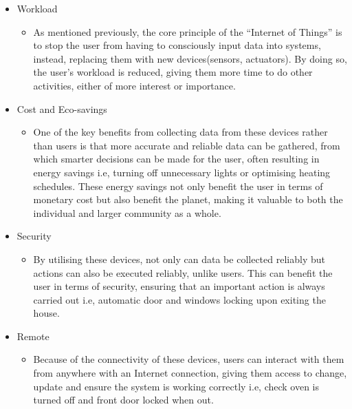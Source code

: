 \begin{itemize}
	\item Workload 
	\begin{itemize}
		\item As mentioned previously, the core principle of the ``Internet of Things'' is to stop the user from having to consciously input data into systems, instead, replacing them with new devices(sensors, actuators). By doing so, the user's workload is reduced, giving them more time to do other activities, either of more interest or importance. 
	\end{itemize}
	\item Cost and Eco-savings
	\begin{itemize}
		\item One of the key benefits from collecting data from these devices rather than users is that more accurate and reliable data can be gathered, from which smarter decisions can be made for the user, often resulting in energy savings i.e, turning off unnecessary lights or optimising heating schedules. These energy savings not only benefit the user in terms of monetary cost but also benefit the planet, making it valuable to both the individual and larger community as a whole.
	\end{itemize}
	\item Security
	\begin{itemize}
		\item By utilising these devices, not only can data be collected reliably but actions can also be executed reliably, unlike users. This can benefit the user in terms of security, ensuring that an important action is always carried out i.e, automatic door and windows locking upon exiting the house.
	\end{itemize}
	\item Remote
	\begin{itemize}
		\item Because of the connectivity of these devices, users can interact with them from anywhere with an Internet connection, giving them access to change, update and ensure the system is working correctly i.e, check oven is turned off and front door locked when out.
	\end{itemize}
\end{itemize}





